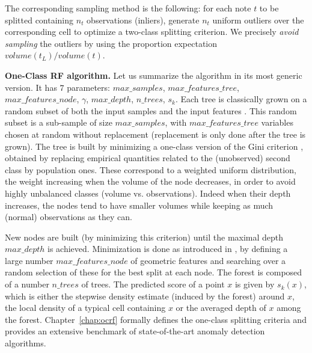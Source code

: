 \begin{remark}
The corresponding sampling method is the following: for each note $t$ to be splitted containing $n_t$ observations (inliers), generate $n_t$ uniform outliers over the corresponding cell to optimize a two-class splitting criterion. We precisely \emph{avoid sampling} the outliers by using the proportion expectation $volume(t_L)/volume(t)$.
\end{remark}



\textbf{One-Class RF algorithm.} Let us summarize the algorithm in its most generic version.
It has $7$ parameters:
$max\_samples$, $max\_features\_tree$, $max\_features\_node$, $\gamma$, $max\_depth$, $n\_trees$, $s_k$.
%
Each tree is classically grown on a random subset of both the input samples and the input features \citep{Ho1998, Panov2007}.
This random subset is a sub-sample of size $max\_samples$, with $max\_features\_tree$ variables chosen at random without replacement (replacement is only done after the tree is grown). The tree is built by minimizing 
a one-class version of the Gini criterion \citep{Gini1912}, obtained by replacing empirical quantities related to the (unobserved) second class by population ones. These correspond to a weighted uniform distribution, the weight increasing when the volume of the node decreases, in order to avoid highly unbalanced classes (volume vs. observations). Indeed when their depth increases, the nodes tend to have smaller volumes while keeping as much (normal) observations as they can.

New nodes are built (by minimizing this criterion) until the maximal depth $max\_depth$ is achieved.
Minimization is done as introduced in \citep{Amit1997}, by defining a large number $max\_features\_node$ of geometric features and searching over a random selection of these for the best split at each node.
%
The forest is composed of a number $n\_trees$ of trees. The predicted score of a point $x$ is given by $s_k(x)$, which is either the stepwise density estimate (induced by the forest) around $x$, the local density of a typical cell containing $x$ or the averaged depth of $x$ among the forest. Chapter~\ref{chap:ocrf} formally defines the one-class splitting criteria and provides an extensive benchmark of state-of-the-art anomaly detection algorithms.








